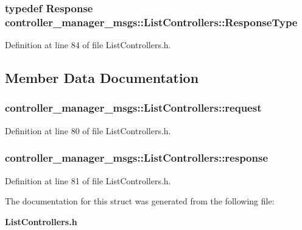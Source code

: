 \subsubsection[{\-Response\-Type}]{\setlength{\rightskip}{0pt plus 5cm}typedef {\bf \-Response} {\bf controller\-\_\-manager\-\_\-msgs\-::\-List\-Controllers\-::\-Response\-Type}}\label{structcontroller__manager__msgs_1_1ListControllers_a32f31dff962ed5aac1c2c5a97936a4a2}


\-Definition at line 84 of file \-List\-Controllers.\-h.



\subsection{\-Member \-Data \-Documentation}
\subsubsection[{request}]{ {\bf controller\-\_\-manager\-\_\-msgs\-::\-List\-Controllers\-::request}}\label{structcontroller__manager__msgs_1_1ListControllers_a8cedd25051315af0fc40b326266f6966}


\-Definition at line 80 of file \-List\-Controllers.\-h.

\subsubsection[{response}]{ {\bf controller\-\_\-manager\-\_\-msgs\-::\-List\-Controllers\-::response}}\label{structcontroller__manager__msgs_1_1ListControllers_a2ae4c113275c8fbe7abff9ecc0ce567a}


\-Definition at line 81 of file \-List\-Controllers.\-h.



\-The documentation for this struct was generated from the following file\-:\begin{DoxyCompactItemize}
\item 
{\bf \-List\-Controllers.\-h}\end{DoxyCompactItemize}
